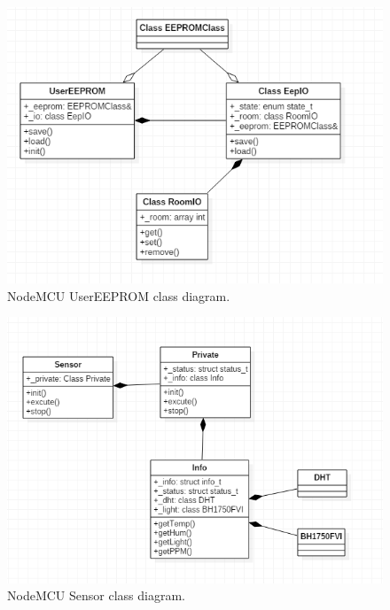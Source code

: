 \documentclass[a4paper,12pt,oneside]{article}
\begin{document}
\begin{figure}[H]
\centering
\begin{center}
\includegraphics[scale=.8]{hinh/class_usereeprom.PNG}
\end{center}
\caption{NodeMCU UserEEPROM class diagram.}
\end{figure}

\begin{figure}[H]
\centering
\begin{center}
\includegraphics[scale=.8]{hinh/class_sensor.PNG}
\end{center}
\caption{NodeMCU Sensor class diagram.}
\end{figure}
\end{document}
